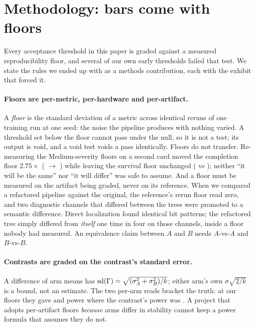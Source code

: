 \section{Methodology: bars come with floors}
\label{sec:method}

Every acceptance threshold in this paper is graded against a measured
reproducibility floor, and several of our own early thresholds failed that
test. We state the rules we ended up with as a methods contribution, each
with the exhibit that forced it.

\paragraph{Floors are per-metric, per-hardware and per-artifact.}
A \emph{floor} is the standard deviation of a metric across identical reruns
of one training run at one seed: the noise the pipeline produces with nothing
varied. A threshold set below the floor cannot pass under the null, so it is
not a test; its output is void, and a void test voids a pass identically.
Floors do not transfer. Re-measuring the Medium-severity floors on a second
card moved the completion floor $2.75\times$ (
$\to$ ) while leaving the survival floor unchanged
( vs ); neither ``it will be the
same'' nor ``it will differ'' was safe to assume. And a floor must be measured
on the artifact being graded, never on its reference. When we compared a
refactored pipeline against the original, the reference's rerun floor read
zero, and two diagnostic channels that differed between the trees were
promoted to a semantic difference. Direct localization found identical bit
patterns; the refactored tree simply differed from \emph{itself} one time in
four on those channels, inside a floor nobody had measured. An equivalence
claim between $A$ and $B$ needs $A$-vs-$A$ and $B$-vs-$B$.

\paragraph{Contrasts are graded on the contrast's standard error.}
A difference of arm means has $\mathrm{sd}(\Gamma) = \sqrt{(\sigma_A^2 +
\sigma_B^2)/k}$; either arm's own $\sigma\sqrt{2/k}$ is a bound, not an
estimate. The two per-arm reads bracket the truth: at our floors they gave
 and  power where the contrast's
power was . A project that adopts per-artifact floors
\emph{because} arms differ in stability cannot keep a power formula that
assumes they do not.

